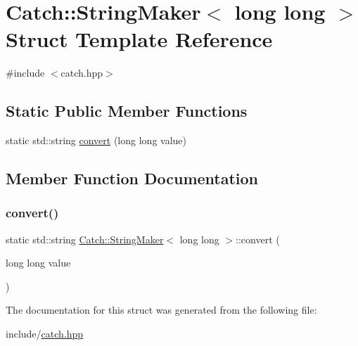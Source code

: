 \hypertarget{structCatch_1_1StringMaker_3_01long_01long_01_4}{}\section{Catch\+:\+:String\+Maker$<$ long long $>$ Struct Template Reference}
\label{structCatch_1_1StringMaker_3_01long_01long_01_4}


{\ttfamily \#include $<$catch.\+hpp$>$}

\subsection*{Static Public Member Functions}
\begin{DoxyCompactItemize}
\item 
static std\+::string \mbox{\hyperlink{structCatch_1_1StringMaker_3_01long_01long_01_4_a7a58929dca2a14c576d7d6d08bc615d2}{convert}} (long long value)
\end{DoxyCompactItemize}


\subsection{Member Function Documentation}
\mbox{\label{structCatch_1_1StringMaker_3_01long_01long_01_4_a7a58929dca2a14c576d7d6d08bc615d2}} 
\subsubsection{\texorpdfstring{convert()}{convert()}}
{\footnotesize\ttfamily static std\+::string \mbox{\hyperlink{structCatch_1_1StringMaker}{Catch\+::\+String\+Maker}}$<$ long long $>$\+::convert (\begin{DoxyParamCaption}\item[{long long}]{value }\end{DoxyParamCaption})\hspace{0.3cm}{\ttfamily [static]}}



The documentation for this struct was generated from the following file\+:\begin{DoxyCompactItemize}
\item 
include/\mbox{\hyperlink{catch_8hpp}{catch.\+hpp}}\end{DoxyCompactItemize}
